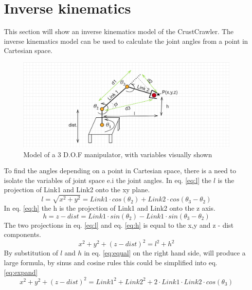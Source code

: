 \section{Inverse kinematics}\label{st:IK}
This section will show an inverse kinematics model of the CrustCrawler. The inverse kinematics model can be used to calculate the joint angles from a point in Cartesian space.

\begin{figure}[H]
    \centering
    \includegraphics[width =\textwidth]{Figures/Technical_figures/invCC.png}
    \caption{Model of a 3 D.O.F manipulator, with variables visually shown}
    \label{fig:invCC}
\end{figure}
To find the angles depending on a point in Cartesian space, there is a need to isolate the variables of joint space e.i the joint angles.
In eq. \ref{eq:l} the $l$ is the projection of Link1 and Link2 onto the xy plane.
\begin{equation}\label{eq:l}
    l = \sqrt{x^2+y^2} = Link1\cdot cos(\theta_2) + Link2\cdot cos(\theta_3 - \theta_2)
\end{equation}
In eq. \ref{eq:h} the h is the projection of Link1 and Link2 onto the z axis.
\begin{equation}\label{eq:h}
    h = z - dist = Link1\cdot sin(\theta_2) - Link1\cdot sin(\theta_3 - \theta_2)
\end{equation}
The two projections in eq. \ref{eq:l} and eq. \ref{eq:h} is equal to the x,y and z - dist components. 
\begin{equation}\label{eq:equal}
    x^2+y^2+(z - dist)^2= l^2 + h^2
\end{equation}
By substitution of $l$ and $h$ in eq. \ref{eq:equal} on the right hand side, will produce a large formula, by sinus and cosine rules this could be simplified into eq. \ref{eq:expand}
\begin{equation}\label{eq:expand}
  x^2+y^2+(z - dist)^2=Link1^2+Link2^2+2 \cdot Link1 \cdot Link2 \cdot cos(\theta_3)
\end{equation} 
